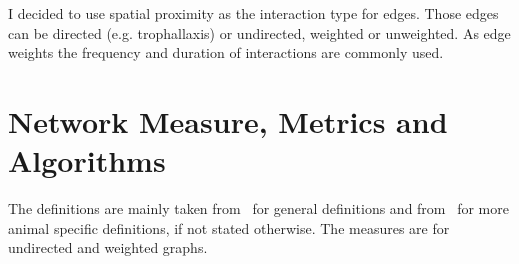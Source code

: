 I decided to use spatial proximity as the interaction type for edges.
Those edges can be directed (e.g. trophallaxis) or undirected, weighted or unweighted. As edge weights the frequency and duration of interactions are commonly used.


\section{Network Measure, Metrics and Algorithms}
The definitions are mainly taken from~\textcite{barabasi2016network} for general definitions and from~\textcite{wey2008social} for more animal specific definitions, if not stated otherwise. The measures are for undirected and weighted graphs.


